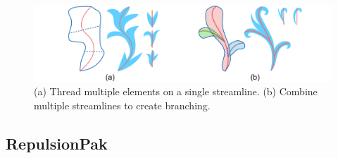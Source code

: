 \begin{figure}
\centering
\includegraphics[width=1.0\textwidth]{figures/conclusions/thread_branch.pdf}
\caption[Element threading and branching]
{ \label{thread_branch} 
\newtext
{
(a) Thread multiple elements on a single streamline.
(b) Combine multiple streamlines to create branching.
}
}
\end{figure}

\subsection{RepulsionPak}


